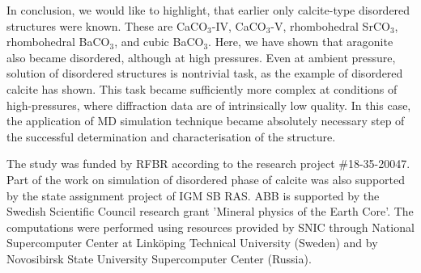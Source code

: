 \documentclass[journal=jacsat,manuscript=article]{achemso}
\begin{document}
In conclusion, we would like to highlight, that earlier only calcite-type disordered structures were known. 
These are CaCO$_3$-IV, CaCO$_3$-V, rhombohedral SrCO$_3$, rhombohedral BaCO$_3$, and cubic BaCO$_3$.
Here, we have shown that aragonite also became disordered, although at high pressures.
Even at ambient pressure, solution of disordered structures is nontrivial task, as the example of disordered calcite has shown.
This task became sufficiently more complex at conditions of high-pressures, where diffraction data are of intrinsically low quality.
In this case, the application of MD simulation technique became absolutely necessary step of the successful determination and characterisation of the structure.

\begin{acknowledgement}
The study was funded by RFBR according to the research project \#18-35-20047. 
Part of the work on simulation of disordered phase of calcite was also supported by the state assignment project of IGM SB RAS. 
ABB is supported by the Swedish Scientific Council research grant 'Mineral physics of the Earth Core'. 
The computations were performed using resources provided by SNIC through National Supercomputer Center at Link\"{o}ping Technical University (Sweden) and by Novosibirsk State University Supercomputer Center (Russia).
\end{acknowledgement}


%
\end{document}
